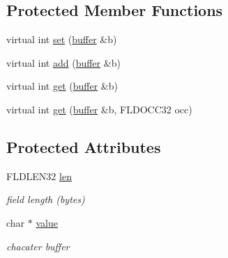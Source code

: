 \subsection*{Protected Member Functions}
\begin{DoxyCompactItemize}
\item 
virtual int \hyperlink{classatmi_1_1_tfield_3_01char_01_5_01_4_af7be84fbdff0665d9c94b83872b299b7}{set} (\hyperlink{classatmi_1_1buffer}{buffer} \&b)
\item 
virtual int \hyperlink{classatmi_1_1_tfield_3_01char_01_5_01_4_ae3036c038b361aee2fc357c1c7d1304a}{add} (\hyperlink{classatmi_1_1buffer}{buffer} \&b)
\item 
virtual int \hyperlink{classatmi_1_1_tfield_3_01char_01_5_01_4_a5df77c9bee99916f6d14f5beeec54dac}{get} (\hyperlink{classatmi_1_1buffer}{buffer} \&b)
\item 
virtual int \hyperlink{classatmi_1_1_tfield_3_01char_01_5_01_4_afaedd7d5902233652bed642bdceb9db1}{get} (\hyperlink{classatmi_1_1buffer}{buffer} \&b, F\+L\+D\+O\+C\+C32 occ)
\end{DoxyCompactItemize}
\subsection*{Protected Attributes}
\begin{DoxyCompactItemize}
\item 
\hypertarget{classatmi_1_1_tfield_3_01char_01_5_01_4_ab48401db01ecdb71e41bb929562cbaf2}{F\+L\+D\+L\+E\+N32 \hyperlink{classatmi_1_1_tfield_3_01char_01_5_01_4_ab48401db01ecdb71e41bb929562cbaf2}{len}}\label{classatmi_1_1_tfield_3_01char_01_5_01_4_ab48401db01ecdb71e41bb929562cbaf2}

\begin{DoxyCompactList}\small\item\em field length (bytes) \end{DoxyCompactList}\item 
\hypertarget{classatmi_1_1_tfield_3_01char_01_5_01_4_a704b8534e0b8680f08b6dde5b06d2317}{char $\ast$ \hyperlink{classatmi_1_1_tfield_3_01char_01_5_01_4_a704b8534e0b8680f08b6dde5b06d2317}{value}}\label{classatmi_1_1_tfield_3_01char_01_5_01_4_a704b8534e0b8680f08b6dde5b06d2317}

\begin{DoxyCompactList}\small\item\em chacater buffer \end{DoxyCompactList}\end{DoxyCompactItemize}


